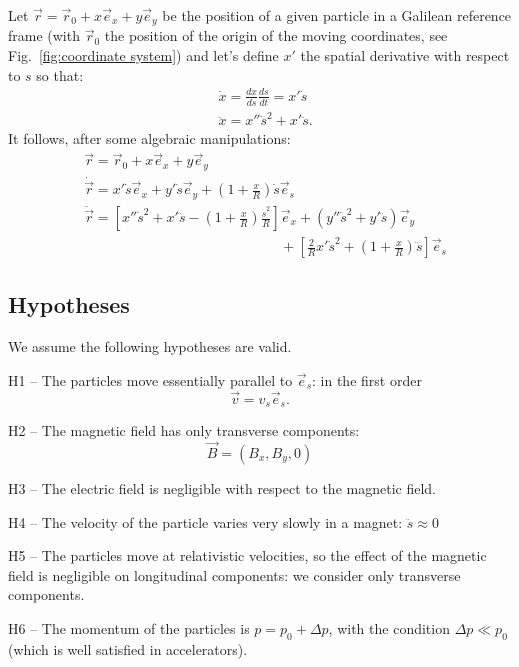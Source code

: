 Let $\vec{r} = \vec{r}_0 + x\vec{e}_x + y \vec{e}_y$ be the position of a given particle in a Galilean reference frame (with $\vec{r}_0$ the position of the origin of the moving coordinates, see Fig.~\ref{fig:coordinate system}) and let's define $x'$ the spatial derivative with respect to $s$ so that:
\begin{equation}
\begin{aligned}
&\dot{x}= \frac{dx}{ds}\frac{ds}{dt} = x'\dot{s}  \\
&\ddot{x}= x''\dot{s}^2+x'\ddot{s}.
\end{aligned}
\end{equation}
It follows, after some algebraic manipulations:
\begin{align}
\label{eq:kinematics}
&\vec{r} = \vec{r}_0 + x\vec{e}_x + y \vec{e}_y \nonumber \\
&\dot{\vec{r}}= x' \dot{s} \vec{e}_x + y'\dot{s} \vec{e}_y  + \left(1+\frac{x}{R}\right)\dot{s}\vec{e}_s\\
&\ddot{\vec{r}}= \left[x'' \dot{s}^2 + x' \ddot{s} - \left( 1+\frac{x}{R} \right)\frac{\dot{s}^2}{R}\right] \vec{e}_x + (y''\dot{s}^2 + y'\ddot{s}) \vec{e}_y \nonumber \\
& \hspace{14em} + \left[\frac{2}{R}x'\dot{s}^2 +\left(1+\frac{x}{R}\right)\ddot{s}\right]\vec{e}_s \nonumber
\end{align}

\subsection{Hypotheses} We assume the following hypotheses are valid.
\begin{description}
    \item{H1 --} The particles move essentially parallel to $\vec{e}_s$: in the first order
    \begin{equation*}
        \vec{v} = v_s \vec{e}_s.
    \end{equation*}
    \item{H2 --} The magnetic field has only transverse components:
        \begin{equation*}
        \vec{B} = (B_x, B_y, 0)
        \end{equation*}
    \item{H3 --} The electric field is negligible with respect to the magnetic field.
    \item{H4 --} The velocity of the particle varies very slowly in a magnet: $\ddot{s} \approx 0$
    \item{H5 --} The particles move at relativistic velocities, so the effect of the magnetic field is negligible on longitudinal components: we consider only transverse components.
    \item{H6 --} The momentum of the particles is $p = p_0+\Delta p$, with the condition $\Delta p \ll p_0$ (which is well satisfied in accelerators).
\end{description}


